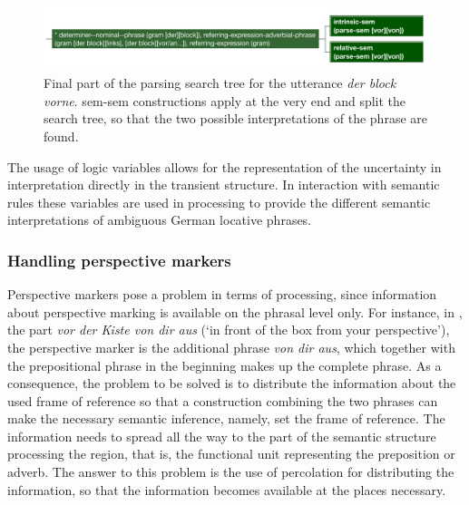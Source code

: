 \begin{figure}
\begin{center}
\includegraphics[width=\columnwidth]{figs/parsing-search-tree-der-block-vorne} 
\caption[Parsing semantically ambiguous phrases]{%
Final part of the parsing search tree for the utterance \textit{der block vorne}. 
sem-sem constructions apply at the very end and split the search tree, so 
that the two possible interpretations of the phrase are found.}
\label{f:parsing-search-tree-der-block-vorne}
\end{center}
\end{figure}

The usage of logic variables allows for the representation of the 
uncertainty in interpretation directly in the transient 
structure. In interaction with semantic rules these variables are used 
in processing to provide the different semantic
interpretations of ambiguous German locative phrases.

\subsubsection{Handling perspective markers}
Perspective markers pose a problem in terms of processing, since 
information about perspective marking 
is available on the phrasal level only. For instance, in  
, the
part \textit{vor der Kiste von dir aus} (`in front of the box from your perspective'), 
the perspective marker is the additional phrase \textit{von dir aus}, which together 
with the prepositional phrase in the beginning
makes up the complete phrase. As a consequence, the problem to be solved 
is to distribute the information about the used frame of reference so that a 
construction combining the two phrases
can make the necessary semantic inference, namely, set the frame of reference. 
The information needs to spread all the way to the part of the semantic structure 
processing the region, that is, the functional unit representing the preposition or adverb. 
The answer to this problem is the use of percolation \citep{steels2011phrasal,steels2011design} 
for distributing the information, so that the information becomes available at
the places necessary. 


